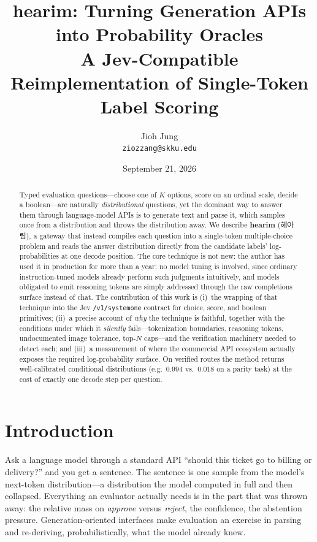 \documentclass[11pt]{article}
\title{hearim: Turning Generation APIs into Probability Oracles\\
\large A Jev-Compatible Reimplementation of Single-Token Label Scoring}
\author{Jioh Jung\\ \texttt{ziozzang@skku.edu}}
\date{September 21, 2026}
\begin{document}
\maketitle

\begin{abstract}
Typed evaluation questions---choose one of $K$ options, score on an ordinal
scale, decide a boolean---are naturally \emph{distributional} questions, yet
the dominant way to answer them through language-model APIs is to generate
text and parse it, which samples once from a distribution and throws the
distribution away. We describe \textbf{hearim} (헤아림), a gateway that
instead compiles each question into a single-token multiple-choice problem
and reads the answer distribution directly from the candidate labels'
log-probabilities at one decode position. The core technique is not new:
the author has used it in production for more than a year; no model tuning
is involved, since ordinary instruction-tuned models already perform such
judgments intuitively, and models obligated to emit reasoning tokens are
simply addressed through the raw completions surface instead of chat. The contribution
of this work is (i)~the wrapping of that technique into the Jev
\texttt{/v1/systemone} contract for choice, score, and boolean primitives;
(ii)~a precise account of \emph{why} the technique is faithful, together
with the conditions under which it \emph{silently} fails---tokenization
boundaries, reasoning tokens, undocumented image tolerance, top-$N$
caps---and the verification machinery needed to detect each; and
(iii)~a measurement of where the commercial API ecosystem actually exposes
the required log-probability surface. On verified routes the method returns
well-calibrated conditional distributions (e.g.\ $0.994$ vs.\ $0.018$ on a
parity task) at the cost of exactly one decode step per question.
\end{abstract}

\section{Introduction}

Ask a language model through a standard API ``should this ticket go to
billing or delivery?'' and you get a sentence. The sentence is one sample
from the model's next-token distribution---a distribution the model
computed in full and then collapsed. Everything an evaluator actually
needs is in the part that was thrown away: the relative mass on
\emph{approve} versus \emph{reject}, the confidence, the abstention
pressure. Generation-oriented interfaces make evaluation an exercise in
parsing and re-deriving, probabilistically, what the model already knew.
\end{document}
